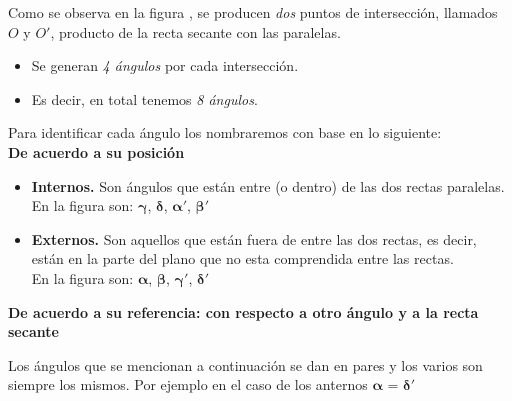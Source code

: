 Como se observa en la figura , se producen \textit{dos} 
puntos de intersección, llamados $O$ y $O'$, producto de la recta secante con 
las paralelas.
\begin{itemize}
  \item Se generan \textit{4 ángulos} por cada intersección.
  \item Es decir, en total tenemos \textit{8 ángulos}.
\end{itemize}

Para identificar cada ángulo los nombraremos con base en lo siguiente:\\

\textbf{De acuerdo a su posición}

\begin{itemize}
  \item \textbf{Internos.} Son ángulos que están entre (o dentro) de las dos
    rectas paralelas.\\
    En la figura son: $\pmb{\gamma}$, $\pmb{\delta}$, 
    $\pmb{\alpha}'$, $\pmb{\beta}'$
  \item \textbf{Externos.} Son aquellos que están fuera de entre las dos rectas,
    es decir, están en la parte del plano que no esta comprendida entre las 
    rectas.\\
    En la figura son: $\pmb{\alpha}$, $\pmb{\beta}$, $\pmb{\gamma'}$, 
    $\pmb{\delta'}$
\end{itemize}

\textbf{De acuerdo a su referencia: con respecto a otro ángulo 
  y a la recta secante
}

Los ángulos que se mencionan a continuación se dan en pares y los varios son 
siempre los mismos. Por ejemplo en el caso de los anternos 
$\pmb{\alpha}$ = $\pmb{\delta'}$

